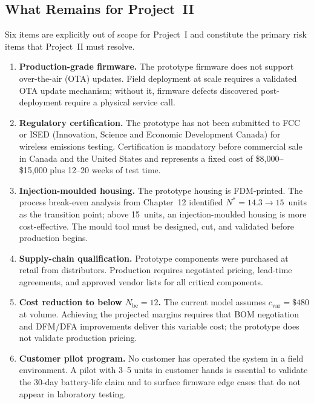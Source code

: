 \subsection{What Remains for Project~II}
\label{sec:ch17-remains}

Six items are explicitly out of scope for Project~I and constitute the
primary risk items that Project~II must resolve.

\begin{enumerate}
  \item \textbf{Production-grade firmware.}
        The prototype firmware does not support over-the-air (OTA) updates.
        Field deployment at scale requires a validated OTA update mechanism;
        without it, firmware defects discovered post-deployment require a
        physical service call.

  \item \textbf{Regulatory certification.}
        The prototype has not been submitted to FCC or ISED (Innovation,
        Science and Economic Development Canada) for wireless emissions
        testing.
        Certification is mandatory before commercial sale in Canada and the
        United States and represents a fixed cost of \$8,000--\$15,000 plus
        12--20 weeks of test time.

  \item \textbf{Injection-moulded housing.}
        The prototype housing is FDM-printed.
        The process break-even analysis from Chapter~12 identified
        $N^* = 14.3 \to 15$~units as the transition point; above 15~units,
        an injection-moulded housing is more cost-effective.
        The mould tool must be designed, cut, and validated before production
        begins.

  \item \textbf{Supply-chain qualification.}
        Prototype components were purchased at retail from distributors.
        Production requires negotiated pricing, lead-time agreements, and
        approved vendor lists for all critical components.

  \item \textbf{Cost reduction to below $N_{\text{be}} = 12$.}
        The current model assumes $c_{\text{var}} = \$480$ at volume.
        Achieving the projected margins requires that BOM negotiation and
        DFM/DFA improvements deliver this variable cost; the prototype does
        not validate production pricing.

  \item \textbf{Customer pilot program.}
        No customer has operated the system in a field environment.
        A pilot with 3--5 units in customer hands is essential to validate
        the 30-day battery-life claim and to surface firmware edge cases that
        do not appear in laboratory testing.
\end{enumerate}

